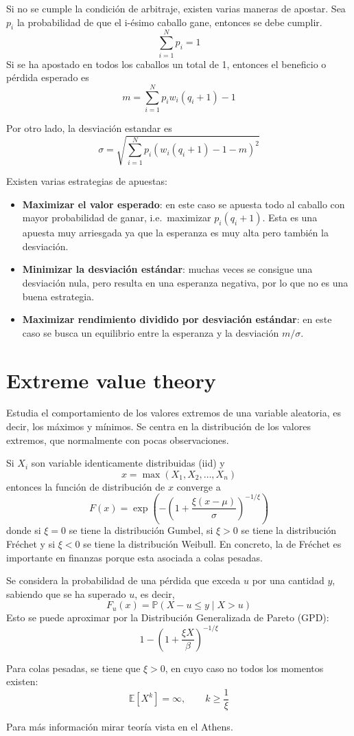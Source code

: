 Si no se cumple la condición de arbitraje, existen varias maneras de apostar. Sea $p_i$ la probabilidad de que el i-ésimo caballo gane, entonces se debe cumplir.
\[
    \sum_{i=1}^N p_i = 1
\]
Si se ha apostado en todos los caballos un total de 1, entonces el beneficio o pérdida esperado es
\[
    m = \sum_{i=1}^N p_i w_i (q_i + 1) - 1
\]

Por otro lado, la desviación estandar es
\[
    \sigma = \sqrt{\sum_{i=1}^N p_i( w_i (q_i + 1) - 1 - m)^2}
\]

Existen varias estrategias de apuestas:
\begin{itemize}
    \item \textbf{Maximizar el valor esperado}: en este caso se apuesta todo al caballo con mayor probabilidad de ganar, i.e.\ maximizar $p_i(q_i+1)$. Esta es una apuesta muy arriesgada ya que la esperanza es muy alta pero también la desviación.
    \item \textbf{Minimizar la desviación estándar}: muchas veces se consigue una desviación nula, pero resulta en una esperanza negativa, por lo que no es una buena estrategia.
    \item \textbf{Maximizar rendimiento dividido por desviación estándar}: en este caso se busca un equilibrio entre la esperanza y la desviación $m/\sigma$.
\end{itemize}













\section{Extreme value theory}
Estudia el comportamiento de los valores extremos de una variable aleatoria, es decir, los máximos y mínimos. Se centra en la distribución de los valores extremos, que normalmente con pocas observaciones.

Si $X_i$ son variable identicamente distribuidas (iid) y
\[
    x = \max(X_1, X_2, \ldots, X_n)
\]
entonces la función de distribución de $x$ converge a
\[
    \boxed{F(x) = \exp\left( -\left( 1 + \frac{\xi (x-\mu)}{\sigma} \right)^{-1/\xi} \right)}
\]
donde si $\xi=0$ se tiene la distribución Gumbel, si $\xi > 0$ se tiene la distribución Fréchet y si $\xi < 0$ se tiene la distribución Weibull. En concreto, la de Fréchet es importante en finanzas porque esta asociada a colas pesadas.


Se considera la probabilidad de una pérdida que exceda $u$ por una cantidad $y$, sabiendo que se ha superado $u$, es decir,
\[
    F_u(x) = \mathbb{P}(X - u \leq  y \mid X > u)
\]
Esto se puede aproximar por la Distribución Generalizada de Pareto (GPD):
\[
    \boxed{1 - \left( 1 + \frac{\xi X}{\beta} \right)^{-1/\xi}}
\]

Para colas pesadas, se tiene que $\xi > 0$, en cuyo caso no todos los momentos existen:
\[
    \mathbb{E}[X^k] = \infty, \qquad k \geq \frac{1}{\xi}
\]

Para más información mirar teoría vista en el Athens.






